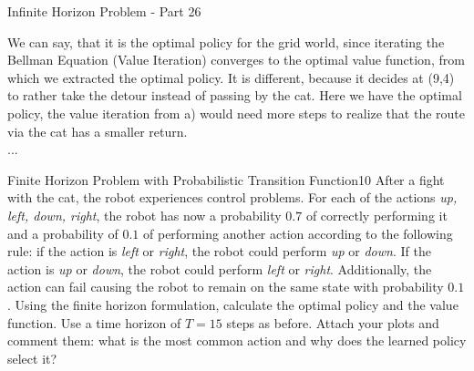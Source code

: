 \begin{questions}
\begin{question}{Infinite Horizon Problem - Part 2}{6}
\begin{answer}
We can say, that it is the optimal policy for the grid world, since iterating the Bellman Equation (Value Iteration) converges to the optimal value function, from which we extracted the optimal policy. It is different, because it decides at (9,4) to rather take the detour instead of passing by the cat. Here we have the optimal policy, the value iteration from a) would need more steps to realize that the route via the cat has a smaller return.\\


	...
	

\end{answer}

\end{question}



\begin{question}{Finite Horizon Problem with Probabilistic Transition Function}{10}
After a fight with the cat, the robot experiences control problems. 
For each of the actions \textit{up, left, down, right}, the robot has now a probability $0.7$ of correctly performing it and a probability of $0.1$ of performing another action according to the following rule: if the action is \textit{left} or \textit{right}, the robot could perform \textit{up} or \textit{down}. If the action is \textit{up} or \textit{down}, the robot could perform \textit{left} or \textit{right}.
Additionally, the action can fail causing the robot to remain on the same state with probability $0.1$.
Using the finite horizon formulation, calculate the optimal policy and the value function. Use a time horizon of $T=15$ steps as before. Attach your plots and comment them: what is the most common action and why does the learned policy select it?

\begin{answer}


\end{answer}
\end{question}
\end{questions}
